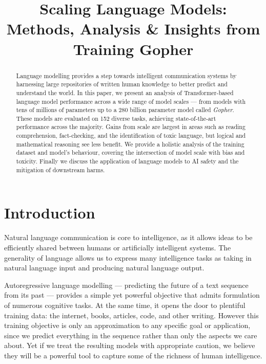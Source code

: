 \title{Scaling Language Models: Methods, Analysis & Insights from Training Gopher}

\begin{abstract}
Language modelling provides a step towards intelligent communication systems by harnessing large repositories of written human knowledge to better predict and understand the world. In this paper, we present an analysis of Transformer-based language model performance across a wide range of model scales --- from models with tens of millions of parameters up to a 280 billion parameter model called \textit{Gopher}. These models are evaluated on 152 diverse tasks, achieving state-of-the-art performance across the majority. Gains from scale are largest in areas such as reading comprehension, fact-checking, and the identification of toxic language, but logical and mathematical reasoning see less benefit. We provide a holistic analysis of the training dataset and model’s behaviour, covering the intersection of model scale with bias and toxicity.  Finally we discuss the application of language models to AI safety and the mitigation of downstream harms.
\end{abstract}

\section{Introduction}
Natural language communication is core to intelligence, as it allows ideas to be efficiently shared between humans or artificially intelligent systems. The generality of language allows us to express many intelligence tasks as taking in natural language input and producing natural language output.

Autoregressive language modelling --- predicting the future of a text sequence from its past --- provides a simple yet powerful objective that admits formulation of numerous cognitive tasks. At the same time, it opens the door to plentiful training data: the internet, books, articles, code, and other writing. However this training objective is only an approximation to any specific goal or application, since we predict everything in the sequence rather than only the aspects we care about. Yet if we treat the resulting models with appropriate caution, we believe they will be a powerful tool to capture some of the richness of human intelligence.

